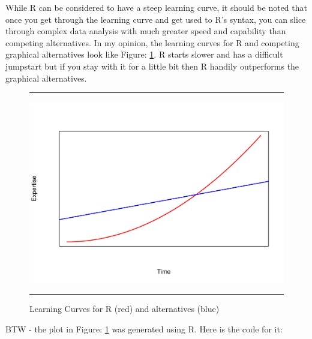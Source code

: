 \documentclass[11pt, letterpaper, twoside]{memoir}\usepackage{knitr}
\begin{document}
While R can be considered to have a steep learning curve, it should be noted that once you get through the learning curve and get used to R's syntax, you can slice through complex data analysis with much greater speed and capability than competing alternatives. In my opinion, the learning curves for R and competing graphical alternatives look like Figure: \ref{fig:lcurve}. R starts slower and has a difficult jumpstart but if you stay with it for a little bit then R handily outperforms the graphical alternatives.

\begin{figure}
\centering
\rule{4in}{1pt}
\begin{knitrout}
\color{fgcolor}
\includegraphics[width=\maxwidth]{figure/unnamed-chunk-6-1} 

\end{knitrout}
\caption{Learning Curves for R (red) and alternatives (blue)}
\label{fig:lcurve}
\rule{4in}{1pt}
\end{figure}

BTW - the plot in Figure: \ref{fig:lcurve} was generated using R. Here is the code for it:
\begin{knitrout}
\color{fgcolor}\begin{kframe}
\begin{alltt}
\hlopt{^}\hlstd{,}  \hlstd{=} \hlstd{,}  \hlstd{=} \hlstd{,}  \hlstd{=} \hlstd{,}  \hlstd{=} \hlstd{,}  \hlstd{=} \hlstd{,}
     \hlstd{=} \hlstd{,}  \hlstd{=} \hlstd{,}  \hlstd{=} \hlstd{)}
\hlstd{(} \hlstd{=} \hlstd{,}  \hlstd{=} \hlstd{,}  \hlstd{=} \hlstd{,}  \hlstd{=} \hlstd{)}
\end{alltt}
\end{kframe}
\end{knitrout}
\end{document}
